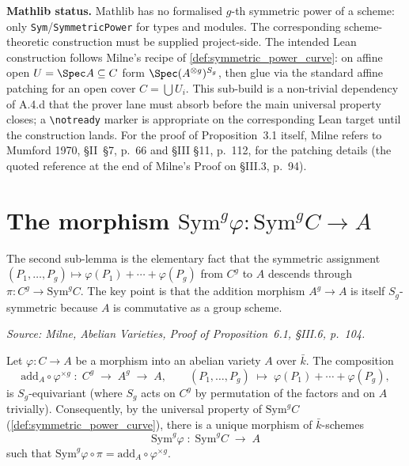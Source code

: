 \medskip

\textbf{Mathlib status.} Mathlib has no formalised \(g\)-th symmetric power of
a scheme: only \texttt{Sym}/\texttt{SymmetricPower} for types and modules.
The corresponding scheme-theoretic construction must be supplied
project-side. The intended Lean construction follows Milne's recipe of
\cref{def:symmetric_power_curve}: on affine open \(U = \Spec A \subseteq C\)
form \(\Spec(A^{\otimes g})^{S_g}\), then glue via the standard affine
patching for an open cover \(C = \bigcup U_i\). This sub-build is a
non-trivial dependency of A.4.d that the prover lane must absorb before the
main universal property closes; a \texttt{\textbackslash notready} marker is
appropriate on the corresponding Lean target until the construction lands.
For the proof of Proposition~3.1 itself, Milne refers to Mumford 1970,
\S II~\S 7, p.~66 and \S III \S 11, p.~112, for the patching details (the
quoted reference at the end of Milne's Proof on \S III.3, p.~94).

\section{The morphism \(\mathrm{Sym}^g \varphi \colon \mathrm{Sym}^g C \to A\)}
\label{sec:albaneseup_sym_g_av_map}

The second sub-lemma is the elementary fact that the symmetric assignment
\((P_1, \ldots, P_g) \mapsto \varphi(P_1) + \cdots + \varphi(P_g)\) from
\(C^g\) to \(A\) descends through \(\pi \colon C^g \to \mathrm{Sym}^g C\). The
key point is that the addition morphism \(A^g \to A\) is itself
\(S_g\)-symmetric because \(A\) is commutative as a group scheme.

\begin{lemma}
  \label{lem:symmetric_product_av_map}

  \textit{Source: Milne, \emph{Abelian Varieties}, Proof of Proposition~6.1,
  \S III.6, p.~104.}

  Let \(\varphi \colon C \to A\) be a morphism into an abelian variety \(A\)
  over \(\bar k\). The composition
  \[
    \mathrm{add}_A \circ \varphi^{\times g}
    \;\colon\; C^g \;\longrightarrow\; A^g \;\longrightarrow\; A,
    \qquad (P_1, \ldots, P_g) \;\longmapsto\; \varphi(P_1) + \cdots + \varphi(P_g),
  \]
  is \(S_g\)-equivariant (where \(S_g\) acts on \(C^g\) by permutation of the
  factors and on \(A\) trivially). Consequently, by the universal property of
  \(\mathrm{Sym}^g C\) (\cref{def:symmetric_power_curve}), there is a unique
  morphism of \(\bar k\)-schemes
  \[
    \mathrm{Sym}^g \varphi \;\colon\; \mathrm{Sym}^g C \;\longrightarrow\; A
  \]
  such that
  \(\mathrm{Sym}^g \varphi \circ \pi = \mathrm{add}_A \circ \varphi^{\times g}\).
\end{lemma}


